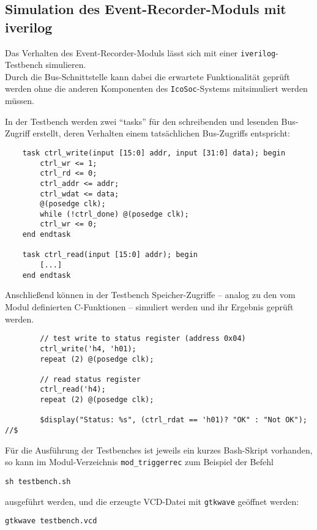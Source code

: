 {\subsection{Simulation des Event-Recorder-Moduls mit iverilog}

Das Verhalten des Event-Recorder-Moduls lässt sich mit einer {\tt iverilog}-Testbench simulieren.\\
Durch die Bus-Schnittstelle kann dabei die erwartete Funktionalität geprüft werden ohne die anderen Komponenten des {\tt IcoSoc}-Systems mitsimuliert werden  müssen.

In der Testbench werden zwei ``tasks'' für den schreibenden und lesenden Bus-Zugriff erstellt, deren Verhalten einem tatsächlichen Bus-Zugriffs entspricht:

\begin{verbatim}
	task ctrl_write(input [15:0] addr, input [31:0] data); begin
		ctrl_wr <= 1;
		ctrl_rd <= 0;
		ctrl_addr <= addr;
		ctrl_wdat <= data;
		@(posedge clk);
		while (!ctrl_done) @(posedge clk);
		ctrl_wr <= 0;
	end endtask

	task ctrl_read(input [15:0] addr); begin
		[...]
	end endtask
\end{verbatim}

Anschließend können in der Testbench Speicher-Zugriffe -- analog zu den vom Modul definierten C-Funktionen -- simuliert werden und ihr Ergebnis geprüft werden.
\begin{verbatim}
		// test write to status register (address 0x04)
		ctrl_write('h4, 'h01); 
		repeat (2) @(posedge clk);
		
		// read status register
		ctrl_read('h4);	
		repeat (2) @(posedge clk);
		
		$display("Status: %s", (ctrl_rdat == 'h01)? "OK" : "Not OK");                                                    //$	

\end{verbatim}

Für die Ausführung der Testbenches ist jeweils ein kurzes Bash-Skript vorhanden, so kann im Modul-Verzeichnis {\tt mod\_triggerrec} zum Beispiel der Befehl
\begin{verbatim}
sh testbench.sh
\end{verbatim}
ausgeführt werden, und die erzeugte VCD-Datei mit {\tt gtkwave} geöffnet werden:
\begin{verbatim}
gtkwave testbench.vcd
\end{verbatim}

}
